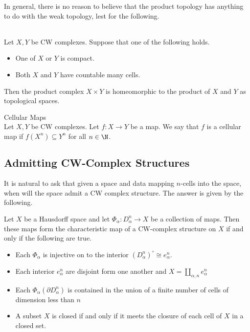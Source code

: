 \documentclass[a4paper]{article}
\begin{document}
In general, there is no reason to believe that the product topology has anything to do with the weak topology, lest for the following. 

\begin{prp}{}{}\\
Let $X,Y$ be CW complexes. Suppose that one of the following holds. 
\begin{itemize}
\item One of $X$ or $Y$ is compact. 
\item Both $X$ and $Y$ have countable many cells. 
\end{itemize}
Then the product complex $X\times Y$ is homeomorphic to the product of $X$ and $Y$ as topological spaces. 
\end{prp}

\begin{defn}{Cellular Maps}{}\\
Let $X,Y$ be CW complexes. Let $f:X\to Y$ be a map. We say that $f$ is a cellular map if $f(X^n)\subseteq Y^n$ for all $n\in\N$. 
\end{defn}

\subsection{Admitting CW-Complex Structures}
It is natural to ask that given a space and data mapping $n$-cells into the space, when will the space admit a CW complex structure. The answer is given by the following. 

\begin{thm}{}{} Let $X$ be a Hausdorff space and let $\Phi_\alpha:D_\alpha^n\to X$ be a collection of maps. Then these maps form the characteristic map of a CW-complex structure on $X$ if and only if the following are true. 
\begin{itemize}
\item Each $\Phi_\alpha$ is injective on to the interior $(D_\alpha^n)^\circ\cong e_{\alpha}^n$. 
\item Each interior $e_\alpha^n$ are disjoint form one another and $X=\coprod_{\alpha,n}e_{\alpha}^n$
\item Each $\Phi_\alpha(\partial D_\alpha^n)$ is contained in the union of a finite number of cells of dimension less than $n$
\item A subset $X$ is closed if and only if it meets the closure of each cell of $X$ in a closed set. 
\end{itemize}
\end{thm}
\end{document}
